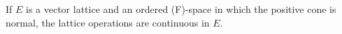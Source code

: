 If $E$ is a vector lattice and an ordered (F)-space in which the positive cone is normal, the lattice operations are continuous in $E$.
